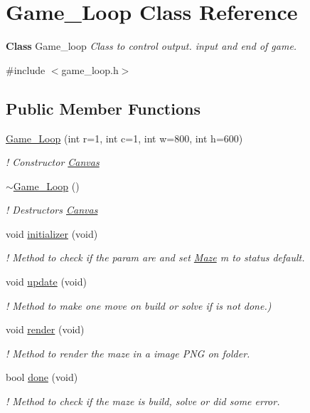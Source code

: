 \hypertarget{classGame__Loop}{}\section{Game\+\_\+\+Loop Class Reference}
\label{classGame__Loop}


{\bfseries Class} Game\+\_\+loop {\itshape Class to control output. input and end of game.}  




{\ttfamily \#include $<$game\+\_\+loop.\+h$>$}

\subsection*{Public Member Functions}
\begin{DoxyCompactItemize}
\item 
\hyperlink{classGame__Loop_a3aaa9f78b2e3bd3711a0552e161d94e4}{Game\+\_\+\+Loop} (int r=1, int c=1, int w=800, int h=600)
\begin{DoxyCompactList}\small\item\em ! Constructor \hyperlink{classCanvas}{Canvas} \end{DoxyCompactList}\item 
\hyperlink{classGame__Loop_a874fb59c1f7dc60273fc5541046838b9}{$\sim$\+Game\+\_\+\+Loop} ()
\begin{DoxyCompactList}\small\item\em ! Destructors \hyperlink{classCanvas}{Canvas} \end{DoxyCompactList}\item 
void \hyperlink{classGame__Loop_a637d18a3f2c22b5ecd4c3f1905e52b88}{initializer} (void)
\begin{DoxyCompactList}\small\item\em ! Method to check if the param are and set \hyperlink{classMaze}{Maze} m to status default. \end{DoxyCompactList}\item 
void \hyperlink{classGame__Loop_a549ad971281e15afa38a5dc204843891}{update} (void)
\begin{DoxyCompactList}\small\item\em ! Method to make one move on build or solve if is not done.) \end{DoxyCompactList}\item 
void \hyperlink{classGame__Loop_a5048bf3b3b18b529fe1e4a474282f274}{render} (void)
\begin{DoxyCompactList}\small\item\em ! Method to render the maze in a image P\+NG on folder. \end{DoxyCompactList}\item 
bool \hyperlink{classGame__Loop_a197233063165098c509b47d9b1da3a36}{done} (void)
\begin{DoxyCompactList}\small\item\em ! Method to check if the maze is build, solve or did some error. \end{DoxyCompactList}\end{DoxyCompactItemize}


